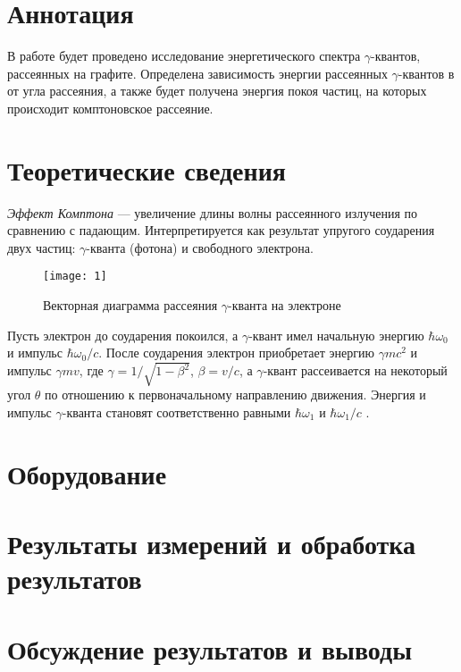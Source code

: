 \documentclass[a4paper, 12pt]{article}
\begin{document}

\section{Аннотация}
В работе будет проведено исследование энергетического спектра
$\gamma$-квантов, рассеянных на графите. Определена зависимость
энергии рассеянных $\gamma$-квантов в от угла рассеяния, а также будет
получена энергия покоя частиц, на которых происходит комптоновское
рассеяние.






\section{Теоретические сведения}
\emph{Эффект Комптона} --- увеличение длины волны рассеянного
излучения по сравнению с падающим. Интерпретируется как результат
упругого соударения двух частиц: $\gamma$-кванта (фотона) и свободного
электрона.

\begin{wrapfigure}{l}{0.3\linewidth}
    \texttt{[image: 1]}
    \caption{Векторная диаграмма рассеяния $\gamma$-кванта на
    электроне}
    \label{fig:1}
\end{wrapfigure}


Пусть электрон до соударения покоился, а $\gamma$-квант имел начальную
энергию $\hbar \omega_0$ и импульс $\hbar \omega_0 /c$. После
соударения электрон приобретает энергию $\gamma m c^2$ и импульс
$\gamma m v$, где $\gamma = 1/\sqrt{1-\beta^2}$, $\beta = v/c$, а
$\gamma$-квант рассеивается на некоторый угол $\theta$ по отношению к
первоначальному направлению движения. Энергия и импульс
$\gamma$-кванта становят соответственно равными $\hbar \omega_1$ и
$\hbar \omega_1 /c$ . 







\section{Оборудование}







\section{Результаты измерений и обработка результатов}







\section{Обсуждение результатов и выводы}
\end{document}

